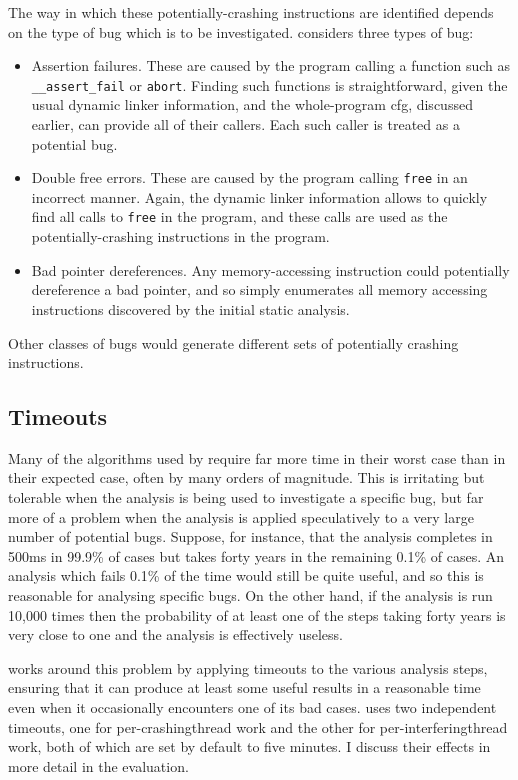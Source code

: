 The way in which these potentially-crashing instructions are
identified depends on the type of bug which is to be investigated.
{\Implementation} considers three types of bug:
\begin{itemize}
\item Assertion failures.  These are caused by the program calling a
  function such as \verb|__assert_fail| or \verb|abort|.  Finding such
  functions is straightforward, given the usual dynamic linker
  information, and the whole-program \gls{cfg}, discussed earlier, can
  provide all of their callers.  Each such caller is treated as a
  potential bug.
\item Double free errors.  These are caused by the program calling
  \verb|free| in an incorrect manner.  Again, the dynamic linker
  information allows {\implementation} to quickly find all calls to
  \verb|free| in the program, and these calls are used as the
  potentially-crashing instructions in the program.
\item Bad pointer dereferences.  Any memory-accessing instruction
  could potentially dereference a bad pointer, and so
  {\implementation} simply enumerates all memory accessing
  instructions discovered by the initial static analysis.
\end{itemize}
Other classes of bugs would generate different sets of potentially
crashing instructions.

\subsection{Timeouts}

Many of the algorithms used by {\technique} require far more time in
their worst case than in their expected case, often by many orders of
magnitude.  This is irritating but tolerable when the analysis is
being used to investigate a specific bug, but far more of a problem
when the analysis is applied speculatively to a very large number of
potential bugs.  Suppose, for instance, that the analysis completes in
500ms in 99.9\% of cases but takes forty years in the remaining 0.1\%
of cases.  An analysis which fails 0.1\% of the time would still be
quite useful, and so this is reasonable for analysing specific bugs.
On the other hand, if the analysis is run 10,000 times then the
probability of at least one of the steps taking forty years is very
close to one and the analysis is effectively useless.

{\Technique} works around this problem by applying timeouts to the
various analysis steps, ensuring that it can produce at least some
useful results in a reasonable time even when it occasionally
encounters one of its bad cases.  {\Implementation} uses two
independent timeouts, one for per-\gls{crashingthread} work and the
other for per-\gls{interferingthread} work, both of which are set by
default to five minutes.  I discuss their effects in more detail in
the evaluation.


